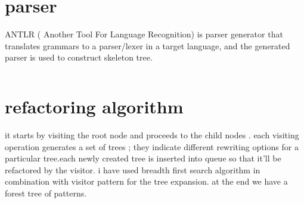 \documentclass[12pt]{report}
\begin{document}
\section{parser}
ANTLR ( Another Tool For Language Recognition) is parser generator that translates  grammars to a parser/lexer in a target language, and the generated parser is used to construct skeleton tree.

\begin{lstlisting}[caption={grammar}, label={grammar}]
\end{lstlisting}
\section{refactoring algorithm}
it starts by visiting the root node and proceeds to the child nodes . each visiting operation generates a set of trees ; they indicate different rewriting options for a particular tree.each newly created tree is inserted into queue so that it'll be refactored by the visitor. i have used breadth first search algorithm in combination with visitor pattern for the tree expansion. at the end we have a forest tree of patterns.
\end{document}
